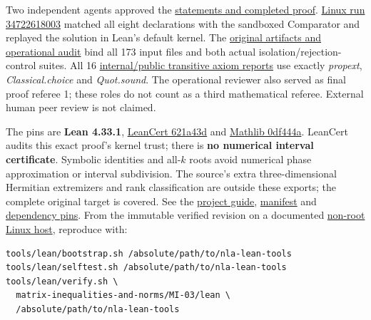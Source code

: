\documentclass[11pt,a4paper]{article}
\begin{document}
Two independent agents approved the
\href{https://github.com/ajt60gaibb/OpenProblemsInNLA/blob/main/matrix-inequalities-and-norms/MI-03/lean/reviews}{statements
and completed proof}.
\href{https://github.com/sgstepaniants/OpenProblemsInNLA/actions/runs/34722618003}{Linux
run 34722618003} matched all eight declarations with the sandboxed
Comparator and replayed the solution in Lean's default kernel. The
\href{https://github.com/ajt60gaibb/OpenProblemsInNLA/blob/main/matrix-inequalities-and-norms/MI-03/lean/verification/linux-2026-09-12}{original
artifacts and operational audit} bind all 173 input files and both
actual isolation/rejection-control suites. All 16
\href{https://github.com/ajt60gaibb/OpenProblemsInNLA/blob/main/matrix-inequalities-and-norms/MI-03/lean/verification/linux-2026-09-12/axiom-verification.json}{internal/public
transitive axiom reports} use exactly \textit{propext},
\textit{Classical.choice} and \textit{Quot.sound}. The operational
reviewer also served as final proof referee 1; these roles do not count
as a third mathematical referee. External human peer review is not
claimed.

The pins are \textbf{Lean 4.33.1},
\href{https://github.com/alerad/leancert/tree/621a43d7cf21f87872392a01e874f2f1dbddc926}{LeanCert
621a43d} and
\href{https://github.com/leanprover-community/mathlib4/tree/0df444a360eaa60ab8c11dca51a86af692955474}{Mathlib
0df444a}. LeanCert audits this exact proof's kernel trust; there is
\textbf{no numerical interval certificate}. Symbolic identities and
all-\(k\) roots avoid numerical phase approximation or interval
subdivision. The source's extra three-dimensional Hermitian extremizers
and rank classification are outside these exports; the complete original
target is covered. See the
\href{https://github.com/ajt60gaibb/OpenProblemsInNLA/blob/main/matrix-inequalities-and-norms/MI-03/lean/README.md}{project
guide},
\href{https://github.com/ajt60gaibb/OpenProblemsInNLA/blob/main/matrix-inequalities-and-norms/MI-03/lean/formalization.yaml}{manifest}
and
\href{https://github.com/ajt60gaibb/OpenProblemsInNLA/blob/main/matrix-inequalities-and-norms/MI-03/lean/lake-manifest.json}{dependency
pins}. From the immutable verified revision on a documented
\href{https://github.com/ajt60gaibb/OpenProblemsInNLA/blob/main/tools/lean/HARNESS.md}{non-root
Linux host}, reproduce with:

\begin{verbatim}
tools/lean/bootstrap.sh /absolute/path/to/nla-lean-tools
tools/lean/selftest.sh /absolute/path/to/nla-lean-tools
tools/lean/verify.sh \
  matrix-inequalities-and-norms/MI-03/lean \
  /absolute/path/to/nla-lean-tools
\end{verbatim}
\end{document}
